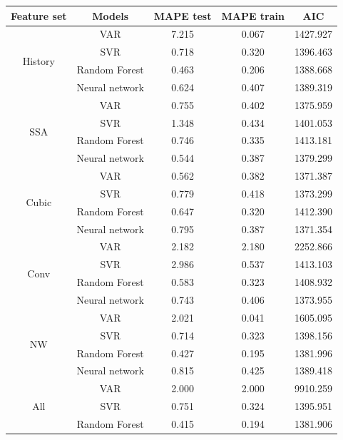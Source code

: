\documentclass[conference]{IEEEtran}
\begin{document}
\begin{table}
\begin{tabular}{|c|c|c|c|c|}
\hline
Feature set & Models &MAPE test & MAPE train & AIC\\
\hline
\multirow{4}{*}{History} &VAR &   7.215 &    0.067 &    1427.927\\
\cline{2-5}
 &SVR &   0.718 &    0.320 &    1396.463\\
\cline{2-5}
 &Random Forest &   0.463 &    0.206 &    1388.668\\
\cline{2-5}
 &Neural network &   0.624 &    0.407 &    1389.319\\
\cline{2-5}
\hline
\multirow{4}{*}{SSA} &VAR &   0.755 &    0.402 &    1375.959\\
\cline{2-5}
 &SVR &   1.348 &    0.434 &    1401.053\\
\cline{2-5}
 &Random Forest &   0.746 &    0.335 &    1413.181\\
\cline{2-5}
 &Neural network &   0.544 &    0.387 &    1379.299\\
\cline{2-5}
\hline
\multirow{4}{*}{Cubic} &VAR &   0.562 &    0.382 &    1371.387\\
\cline{2-5}
 &SVR &   0.779 &    0.418 &    1373.299\\
\cline{2-5}
 &Random Forest &   0.647 &    0.320 &    1412.390\\
\cline{2-5}
 &Neural network &   0.795 &    0.387 &    1371.354\\
\cline{2-5}
\hline
\multirow{4}{*}{Conv} &VAR &   2.182 &    2.180 &    2252.866\\
\cline{2-5}
 &SVR &   2.986 &    0.537 &    1413.103\\
\cline{2-5}
 &Random Forest &   0.583 &    0.323 &    1408.932\\
\cline{2-5}
 &Neural network &   0.743 &    0.406 &    1373.955\\
\cline{2-5}
\hline
\multirow{4}{*}{NW} &VAR &   2.021 &    0.041 &    1605.095\\
\cline{2-5}
 &SVR &   0.714 &    0.323 &    1398.156\\
\cline{2-5}
 &Random Forest &   0.427 &    0.195 &    1381.996\\
\cline{2-5}
 &Neural network &   0.815 &    0.425 &    1389.418\\
\cline{2-5}
\hline
\multirow{4}{*}{All} &VAR &   2.000 &    2.000 &    9910.259\\
\cline{2-5}
 &SVR &   0.751 &    0.324 &    1395.951\\
\cline{2-5}
 &Random Forest &   0.415 &    0.194 &    1381.906\\

\end{tabular}
\end{table}
\end{document}
